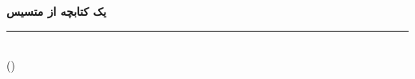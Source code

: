 \begin{titlepage}
\thispagestyle{empty}
\begin{center}
\vspace*{3cm}

{\bfseries\color{accent}\MakeUppercase{یک کتابچه از متسیس}}

\vspace{1.5cm}

{\Huge\bfseries\color{primary}\BookletTitle\par}

\vspace{0.8cm}
\textcolor{accent}{\rule{0.35\textwidth}{1.2pt}}
\vspace{0.8cm}

{\Large\itshape\color{textsecondary}\BookletSubtitle\par}

\vfill

{\large\bfseries\BookletAuthor}\\[0.2em]
{\small\color{textsecondary}(\BookletAuthorHandle)}\\[0.2em]
{\small\ttfamily\color{textsecondary}\lr{\BookletEmail}}

\vspace{1.5cm}
{\small\color{textsecondary}\BookletYear}

\end{center}
\end{titlepage}

